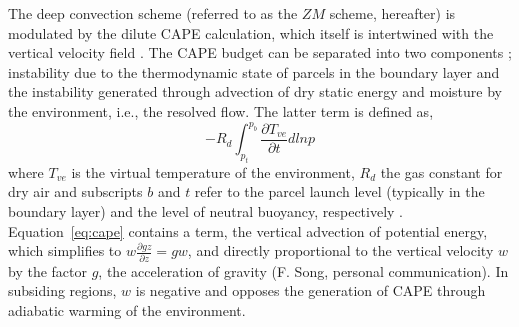 \documentclass[times]{qjrms4}
\begin{document}
The \cite{ZM1995AO} deep convection scheme (referred to as the $ZM$ scheme, hereafter) is modulated by the dilute CAPE calculation, which itself is intertwined with the vertical velocity field \citep{SZ2018JCLIM}. The CAPE budget can be separated into two components \citep{Z2002JGR}; instability due to the thermodynamic state of parcels in the boundary layer and the instability generated through advection of dry static energy and moisture by the environment, i.e., the resolved flow. The latter term is defined as, 
\begin{equation}
-R_d \int_{p_t}^{p_b} \frac{\partial T_{ve}}{\partial t} dlnp \label{eq:cape}
\end{equation}
where $T_{ve}$ is the virtual temperature of the environment, $R_d$ the gas constant for dry air and subscripts $b$ and $t$ refer to the parcel launch level (typically in the boundary layer) and the level of neutral buoyancy, respectively \citep{Z2002JGR}. Equation~\ref{eq:cape} contains a term, the vertical advection of potential energy, which simplifies to $w \frac{\partial gz}{\partial z} = gw$, and directly proportional to the vertical velocity $w$ by the factor $g$, the acceleration of gravity (F. Song, personal communication). In subsiding regions, $w$ is negative and opposes the generation of CAPE through adiabatic warming of the environment.
\end{document}
